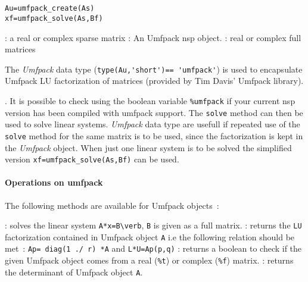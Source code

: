 
\begin{mandesc}
  \\
  \\
\end{mandesc}

\begin{calling_sequence}
\begin{verbatim}
Au=umfpack_create(As)
xf=umfpack_solve(As,Bf)
\end{verbatim}
\end{calling_sequence}
\begin{parameters}
  \begin{varlist}
    : a real or complex sparse matrix
    : An Umfpack nsp object.
    : real or complex full matrices 
  \end{varlist}
\end{parameters}

\begin{mandescription}
The \emph{Umfpack} data type (\verb+type(Au,'short')== 'umfpack'+) is used to 
encapsulate Umfpack LU factorization of matrices (provided by Tim Davis' Umfpack library). 
\end{mandescription}. It is possible to check using the boolean variable \verb+%umfpack+ 
if your current nsp version has been compiled with umfpack support. The \verb+solve+ method 
can then be used to solve linear systems. \emph{Umfpack} data type are usefull if 
repeated use of the \verb+solve+ method for the same matrix is to be used, 
since the factorization is kept in the \emph{Umfpack} object. When just one linear 
system is to be solved the simplified version \verb+xf=umfpack_solve(As,Bf)+ can be used. 

\paragraph{Operations on umfpack}
The following methods are available for Umfpack objects~:
\begin{varlist}
  : solves the linear system \verb+A*x=B\verb+, \verb+B+ is given as a full 
   matrix. 
  : returns the \verb+LU+ factorization contained in Umfpack object \verb+A+ i.e the following relation should be met~: \verb+Ap= diag(1 ./ r) *A+ and 
  \verb+L*U=Ap(p,q)+ 
  : returns a boolean to check if the given Umfpack object comes from a real 
(\verb+%t+) or complex (\verb+%f+) matrix. 
: returns the determinant of Umfpack object \verb+A+.
  \end{varlist}

